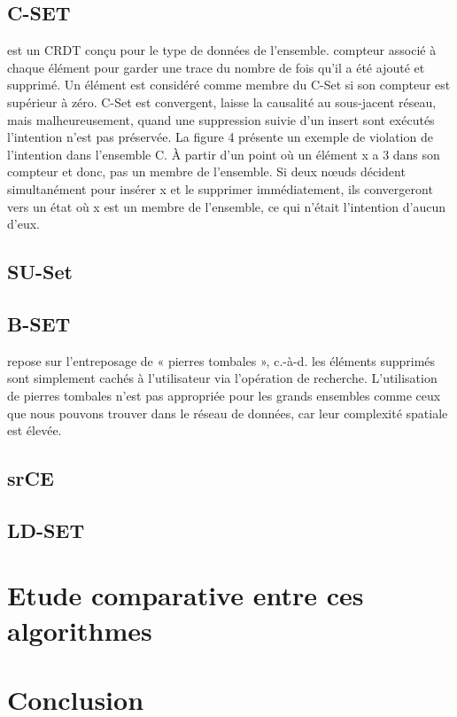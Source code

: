 \documentclass[12pt]{report}
\begin{document}
\subsection{C-SET \cite{C-SET}}
est un CRDT conçu pour le type de données de l’ensemble.
compteur associé à chaque élément pour garder une trace du nombre de fois qu’il a été ajouté et supprimé. Un élément est considéré comme membre du C-Set si son compteur
est supérieur à zéro. C-Set est convergent, laisse la causalité au sous-jacent réseau, mais malheureusement, quand une suppression suivie d’un insert sont exécutés
l’intention n’est pas préservée. La figure 4 présente un exemple de violation de l’intention dans l’ensemble C. À partir d’un point où un élément x a 3 dans son compteur et donc, pas un membre de l’ensemble. Si deux nœuds décident simultanément pour insérer x et le supprimer immédiatement, ils convergeront vers un état où x est un membre de l’ensemble, ce qui n’était l’intention d’aucun d’eux.
\subsection{SU-Set}
\subsection{B-SET \cite{B-SET}} repose sur l’entreposage de « pierres tombales », c.-à-d. les éléments supprimés sont simplement cachés à l’utilisateur via l’opération de recherche. L’utilisation de pierres tombales n’est pas appropriée pour les grands ensembles comme ceux que nous pouvons trouver dans le réseau de données, car leur complexité spatiale est élevée.
\subsection{srCE}
\subsection{LD-SET}
\section{Etude comparative entre ces algorithmes}
\section*{Conclusion}
 

 

\end{document}
